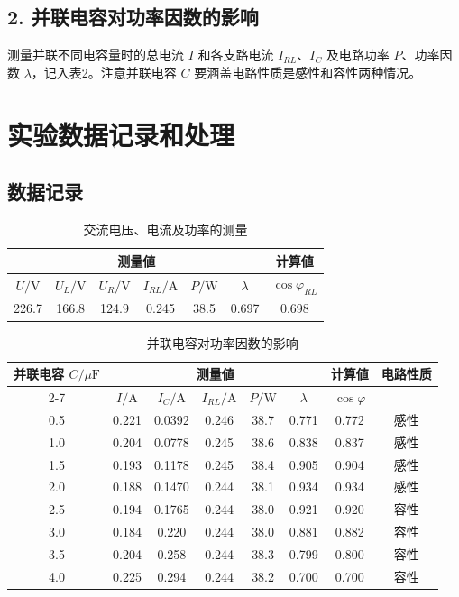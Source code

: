 \documentclass[10.5pt]{config}
\begin{document}
\subsection*{2. 并联电容对功率因数的影响}
测量并联不同电容量时的总电流 $I$ 和各支路电流 $I_{RL}$、$I_C$ 及电路功率 $P$、功率因数 $\lambda$，记入表2。注意并联电容 $C$ 要涵盖电路性质是感性和容性两种情况。


\section{实验数据记录和处理}
\subsection{数据记录}

\begin{table}[H]
    \centering
    \small
    \begin{tabular}{|c|c|c|c|c|c|c|}
        \hline
        \multicolumn{6}{|c|}{测量値} & 计算値 \\
        \hline
        $U/\mathrm{V}$ & $U_L/\mathrm{V}$ & $U_R/\mathrm{V}$ & $I_{RL}/\mathrm{A}$ & $P/\mathrm{W}$ & $\lambda$ & $\cos\varphi_{RL}$ \\
        \hline
         226.7& 166.8&124.9 &0.245 &38.5 &0.697 & 0.698\\
        \hline
    \end{tabular}
    \caption{交流电压、电流及功率的测量}
    \label{tab:ac_measure}
\end{table}

\begin{table}[H]
    \centering
    \small
    \begin{tabular}{|c|c|c|c|c|c|c|c|}
        \hline
        \multirow{2}{*}{并联电容 $C/\mu\mathrm{F}$} & \multicolumn{5}{c|}{测量値} & 计算値 & \multirow{2}{*}{电路性质} \\
        \cline{2-7}
         & $I/\mathrm{A}$ & $I_C/\mathrm{A}$ & $I_{RL}/\mathrm{A}$ & $P/\mathrm{W}$ & $\lambda$ & $\cos\varphi$ & \\
        \hline
        0.5 &0.221 &0.0392 &0.246 &38.7 &0.771 &0.772 & 感性\\
        \hline
        1.0 &0.204 &0.0778 &0.245 &38.6 &0.838 & 0.837& 感性\\
        \hline
        1.5 &0.193 &0.1178 &0.245 &38.4 &0.905 &0.904 & 感性\\
        \hline
        2.0 &0.188 &0.1470 &0.244 &38.1 &0.934 &0.934 & 感性\\
        \hline
        2.5 &0.194 &0.1765 &0.244 &38.0 & 0.921& 0.920& 容性\\
        \hline
        3.0 &0.184 &0.220 &0.244 &38.0 &0.881 &0.882 &容性 \\
        \hline
        3.5 &0.204 &0.258 & 0.244&38.3 &0.799 &0.800 & 容性\\
        \hline
        4.0 & 0.225&0.294 &0.244 &38.2 &0.700 &0.700 & 容性\\
        \hline
    \end{tabular}
    \caption{并联电容对功率因数的影响}
    \label{tab:capacitor_pf}
\end{table}
\end{document}

